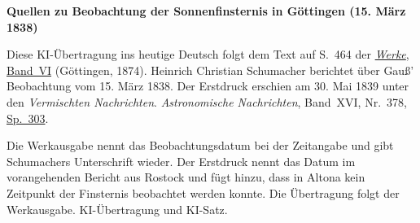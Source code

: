 \clearpage\thispagestyle{empty}
\begin{center}\textbf{Quellen zu Beobachtung der Sonnenfinsternis in Göttingen (15. März 1838)}\end{center}
\noindent Diese KI-Übertragung ins heutige Deutsch folgt dem Text auf S.~464 der \href{https://gdz.sub.uni-goettingen.de/id/PPN236007467}{\textit{Werke}, Band~VI} (Göttingen, 1874). Heinrich Christian Schumacher berichtet über Gauß’ Beobachtung vom 15. März 1838. Der Erstdruck erschien am 30. Mai 1839 unter den \textit{Vermischten Nachrichten}. \textit{Astronomische Nachrichten}, Band~XVI, Nr.~378, \href{https://api.digitale-sammlungen.de/iiif/image/v2/bsb10049441_00162/full/1800,/0/default.jpg}{Sp.~303}.
\par\smallskip\noindent Die Werkausgabe nennt das Beobachtungsdatum bei der Zeitangabe und gibt Schumachers Unterschrift wieder. Der Erstdruck nennt das Datum im vorangehenden Bericht aus Rostock und fügt hinzu, dass in Altona kein Zeitpunkt der Finsternis beobachtet werden konnte. Die Übertragung folgt der Werkausgabe. KI-Übertragung und KI-Satz.
\clearpage
